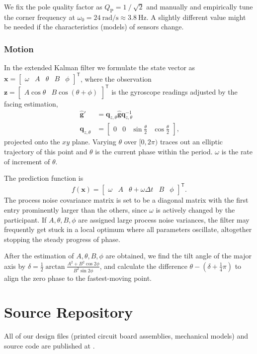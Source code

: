 \documentclass{nime-alternate} %
\begin{document}
We fix the pole quality factor as $Q_\mathrm{P} = 1 \mathbin{\mathop{/}} \sqrt{2}$ and manually and empirically tune the corner frequency at $\omega_0 = 24\ \text{rad/s} \approx 3.8\ \text{Hz}$. A slightly different value might be needed if the characteristics (models) of sensors change.

\subsubsection{Motion}
\label{appendix:est-motion}
In the extended Kalman filter we formulate the state vector as $\mathbf{x} = \begin{bmatrix} \omega & A & \theta & B & \phi \end{bmatrix}^\mathsf{T}$, where the observation $\mathbf{z} = \begin{bmatrix} A \cos \theta & B \cos (\theta + \phi) \end{bmatrix}^\mathsf{T}$ is the gyroscope readings adjusted by the facing estimation,
\begin{equation}
\begin{split}
\hat{\mathbf{g}}' &= \mathbf{q}_{z, \theta} \hat{\mathbf{g}} \mathbf{q}_{z, \theta}^{-1} \\
\mathbf{q}_{z, \theta} &= \begin{bmatrix} 0 & 0 & \sin \frac \theta 2 & \cos \frac \theta 2 \end{bmatrix}
\text{,}
\end{split}
\end{equation}
projected onto the $xy$ plane. Varying $\theta$ over $[0, 2\pi)$ traces out an elliptic trajectory of this point and $\theta$ is the current phase within the period. $\omega$ is the rate of increment of $\theta$.

The prediction function is
\begin{equation}
f(\mathbf{x}) = \begin{bmatrix} \omega & A & \theta + \omega \Delta t & B & \phi \end{bmatrix}^\mathsf{T}\text{.}
\end{equation}
The process noise covariance matrix is set to be a diagonal matrix with the first entry prominently larger than the others, since $\omega$ is actively changed by the participant. If $A, \theta, B, \phi$ are assigned large process noise variances, the filter may frequently get stuck in a local optimum where all parameters oscillate, altogether stopping the steady progress of phase.

After the estimation of $A, \theta, B, \phi$ are obtained, we find the tilt angle of the major axis by $\delta = \frac 1 2 \mathop{\mathrm{arctan}} \frac {A^2 + B^2 \cos 2\phi} {B^2 \sin 2\phi}$, and calculate the difference $\theta - (\delta + \frac 1 4 \pi)$ to align the zero phase to the fastest-moving point.

\section{Source Repository}
All of our design files (printed circuit board assemblies, mechanical models) and source code are published at \newline {}.
\end{document}
